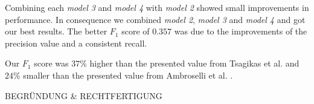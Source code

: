 Combining each \textit{model 3} and \textit{model 4} with \textit{model 2} showed small improvements in performance. In consequence we combined \textit{model 2}, \textit{model 3} and \textit{model 4} and got our best results. The better $F_1$ score of $0.357$ was due to the improvements of the precision value and a consistent recall.

Our $F_1$ score was $37\%$ higher than the presented value from Tsagikas et al. \cite{tsagkias2009predicting} and $24\%$ smaller than the presented value from Ambroselli et al. \cite{ambroselli2018prediction}.

BEGRÜNDUNG \& RECHTFERTIGUNG



